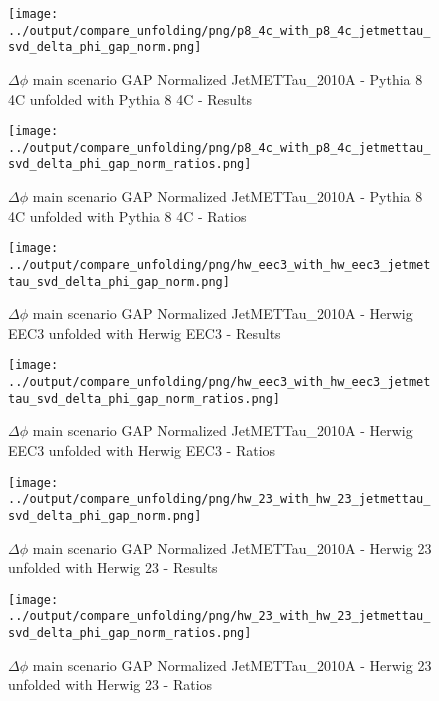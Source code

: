 \documentclass[11pt]{book}
\begin{document}
\begin{figure}[ht]
\centering
\texttt{[image: ../output/compare\_unfolding/png/p8\_4c\_with\_p8\_4c\_jetmettau\_svd\_delta\_phi\_gap\_norm.png]}
\caption{$\Delta\phi$ main scenario GAP Normalized JetMETTau\_2010A - Pythia 8 4C unfolded with Pythia 8 4C - Results}
\label{p8_p8_jetmettau_svd_delta_phi_gap_norm_a}
\end{figure}

\begin{figure}[ht]
\centering
\texttt{[image: ../output/compare\_unfolding/png/p8\_4c\_with\_p8\_4c\_jetmettau\_svd\_delta\_phi\_gap\_norm\_ratios.png]}
\caption{$\Delta\phi$ main scenario GAP Normalized JetMETTau\_2010A - Pythia 8 4C unfolded with Pythia 8 4C - Ratios}
\label{p8_p8_jetmettau_svd_delta_phi_gap_norm_b}
\end{figure}

\begin{figure}[ht]
\centering
\texttt{[image: ../output/compare\_unfolding/png/hw\_eec3\_with\_hw\_eec3\_jetmettau\_svd\_delta\_phi\_gap\_norm.png]}
\caption{$\Delta\phi$ main scenario GAP Normalized JetMETTau\_2010A - Herwig EEC3 unfolded with Herwig EEC3 - Results}
\label{hw_eec3_hw_eec3_jetmettau_svd_delta_phi_gap_norm_a}
\end{figure}

\begin{figure}[ht]
\centering
\texttt{[image: ../output/compare\_unfolding/png/hw\_eec3\_with\_hw\_eec3\_jetmettau\_svd\_delta\_phi\_gap\_norm\_ratios.png]}
\caption{$\Delta\phi$ main scenario GAP Normalized JetMETTau\_2010A - Herwig EEC3 unfolded with Herwig EEC3 - Ratios}
\label{hw_eec3_hw_eec3_jetmettau_svd_delta_phi_gap_norm_b}
\end{figure}

\begin{figure}[ht]
\centering
\texttt{[image: ../output/compare\_unfolding/png/hw\_23\_with\_hw\_23\_jetmettau\_svd\_delta\_phi\_gap\_norm.png]}
\caption{$\Delta\phi$ main scenario GAP Normalized JetMETTau\_2010A - Herwig 23 unfolded with Herwig 23 - Results}
\label{hw_23_hw_23_jetmettau_svd_delta_phi_gap_norm_a}
\end{figure}

\begin{figure}[ht]
\centering
\texttt{[image: ../output/compare\_unfolding/png/hw\_23\_with\_hw\_23\_jetmettau\_svd\_delta\_phi\_gap\_norm\_ratios.png]}
\caption{$\Delta\phi$ main scenario GAP Normalized JetMETTau\_2010A - Herwig 23 unfolded with Herwig 23 - Ratios}
\label{hw_23_hw_23_jetmettau_svd_delta_phi_gap_norm_b}
\end{figure}
\end{document}
